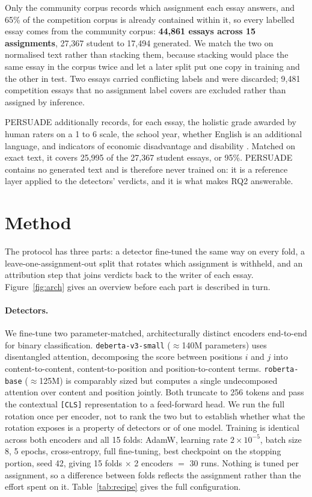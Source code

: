 \documentclass{article}
\begin{document}
Only the community corpus records which assignment each essay answers, and
65\% of the competition corpus is already contained within it, so every
labelled essay comes from the community corpus: \textbf{44,861 essays across
15 assignments}, 27,367 student to 17,494 generated. We match the two on
normalised text rather than stacking them, because stacking would place the
same essay in the corpus twice and let a later split put one copy in
training and the other in test. Two essays carried conflicting labels and
were discarded; 9,481 competition essays that no assignment label covers
are excluded rather than assigned by inference.

PERSUADE additionally records, for each essay, the holistic grade awarded
by human raters on a 1 to 6 scale, the school year, whether English is an
additional language, and indicators of economic disadvantage and disability
\cite{crossley2024}. Matched on exact text, it covers 25,995 of the 27,367
student essays, or 95\%. PERSUADE contains no generated text and is
therefore never trained on: it is a reference layer applied to the
detectors' verdicts, and it is what makes RQ2 answerable.

\section{Method}


The protocol has three parts: a detector fine-tuned the same way on every
fold, a leave-one-assignment-out split that rotates which assignment is
withheld, and an attribution step that joins verdicts back to the writer of
each essay. Figure~\ref{fig:arch} gives an overview before each part is
described in turn.

\paragraph{Detectors.}
We fine-tune two parameter-matched, architecturally distinct encoders
end-to-end for binary classification. \texttt{deberta-v3-small} ($\approx$140M
parameters) uses disentangled attention, decomposing the score between
positions $i$ and $j$ into content-to-content, content-to-position and
position-to-content terms. \texttt{roberta-base} ($\approx$125M) is comparably
sized but computes a single undecomposed attention over content and
position jointly. Both truncate to 256 tokens and pass the contextual
\texttt{[CLS]} representation to a feed-forward head. We run the full
rotation once per encoder, not to rank the two but to establish whether
what the rotation exposes is a property of detectors or of one model.
Training is identical across both encoders and all 15 folds: AdamW,
learning rate $2\times10^{-5}$, batch size 8, 5 epochs, cross-entropy, full
fine-tuning, best checkpoint on the stopping portion, seed 42, giving
15 folds $\times$ 2 encoders $=$ 30 runs. Nothing is tuned per assignment,
so a difference between folds reflects the assignment rather than the
effort spent on it. Table~\ref{tab:recipe} gives the full
configuration.
\end{document}
